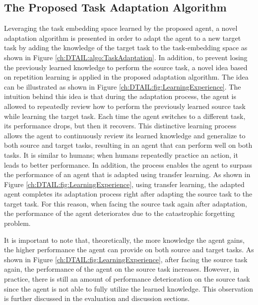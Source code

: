     \subsection{The Proposed Task Adaptation Algorithm}
    Leveraging the task embedding space learned by the proposed agent,
    a novel adaptation algorithm is presented in order to adapt the agent to a new target task by adding the knowledge of the target task to the task-embedding space as shown in Figure \ref{ch:DTAIL:algo:TaskAdaptation}.
    In addition,
    to prevent losing the previously learned knowledge to perform the source task,
    a novel idea based on repetition learning is applied in the proposed adaptation algorithm.
    The idea can be illustrated as shown in Figure \ref{ch:DTAIL:fig:LearningExperience}.
    The intuition behind this idea is that during the adaptation process,
    the agent is allowed to repeatedly review how to perform the previously learned source task while learning the target task.
    Each time the agent switches to a different task,
    its performance drops,
    but then it recovers.
    This distinctive learning process allows the agent to continuously review its learned knowledge and generalize to both source and target tasks, resulting in an agent that can perform well on both tasks.
    It is similar to humans;
    when humans repeatedly practice an action,
    it leads to better performance.
    In addition,
    the process enables the agent to surpass the performance of an agent that is adapted using transfer learning.
    As shown in Figure \ref{ch:DTAIL:fig:LearningExperience},
    using transfer learning,
    the adapted agent completes its adaptation process right after adapting the source task to the target task.
    For this reason,
    when facing the source task again after adaptation,
    the performance of the agent deteriorates due to the catastrophic forgetting problem.


    It is important to note that,
    theoretically,
    the more knowledge the agent gains,
    the higher performance the agent can provide on both source and target tasks.
    As shown in Figure \ref{ch:DTAIL:fig:LearningExperience},
    after facing the source task again,
    the performance of the agent on the source task increases.
    However,
    in practice,
    there is still an amount of performance deterioration on the source task since the agent is not able to fully utilize the learned knowledge.
    This observation is further discussed in the evaluation and discussion sections.


